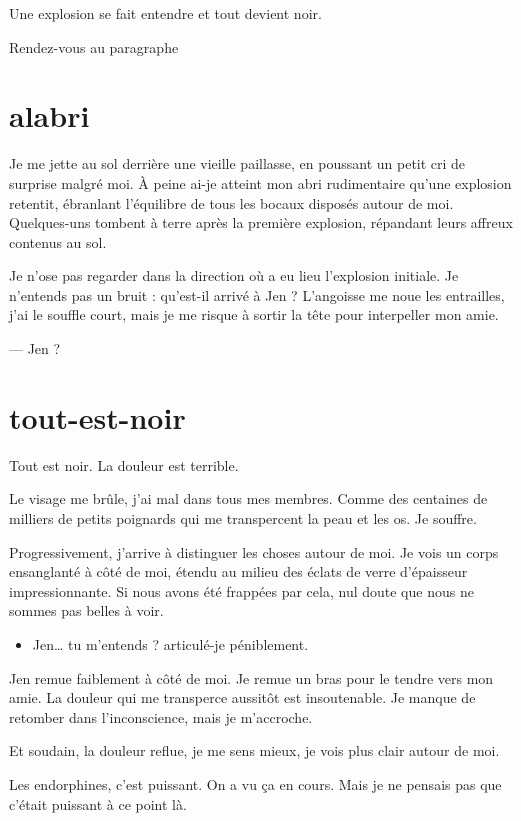 Une explosion se fait entendre et tout devient noir.

\item Rendez-vous au paragraphe 
\enw

\section{alabri}
Je me jette au sol derrière une vieille paillasse, en poussant un petit cri de surprise malgré moi. À peine ai-je atteint mon abri rudimentaire qu'une explosion retentit, ébranlant l'équilibre de tous les bocaux disposés autour de moi. Quelques-uns tombent à terre après la première explosion, répandant leurs affreux contenus au sol.

Je n'ose pas regarder dans la direction où a eu lieu l'explosion initiale. Je n'entends pas un bruit : qu'est-il arrivé à Jen ? L'angoisse me noue les entrailles, j'ai le souffle court, mais je me risque à sortir la tête pour interpeller mon amie.

--- Jen ?

 
\section{tout-est-noir}

Tout est noir. La douleur est terrible.

Le visage me brûle, j'ai mal dans tous mes membres. Comme des centaines de milliers de petits poignards qui me transpercent la peau et les os. Je souffre.

Progressivement, j'arrive à distinguer les choses autour de moi. Je vois un corps ensanglanté à côté de moi, étendu au milieu des éclats de verre d'épaisseur impressionnante. Si nous avons été frappées par cela, nul doute que nous ne sommes pas belles à voir.

\begin{itemize}
\item Jen… tu m'entends ? articulé-je péniblement.
\end{itemize}

Jen remue faiblement à côté de moi. Je remue un bras pour le tendre vers mon amie. La douleur qui me transperce aussitôt est insoutenable. Je manque de retomber dans l'inconscience, mais je m'accroche.

Et soudain, la douleur reflue, je me sens mieux, je vois plus clair autour de moi.

Les endorphines, c'est puissant. On a vu ça en cours. Mais je ne pensais pas que c'était puissant à ce point là.

